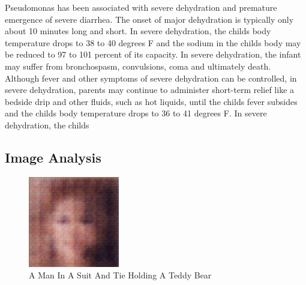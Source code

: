 \documentclass{article}%
\begin{document}
Pseudomonas has been associated with severe dehydration and premature emergence of severe diarrhea. The onset of major dehydration is typically only about 10 minutes long and short. In severe dehydration, the childs body temperature drops to 38 to 40 degrees F and the sodium in the childs body may be reduced to 97 to 101 percent of its capacity. In severe dehydration, the infant may suffer from bronchospasm, convulsions, coma and ultimately death. Although fever and other symptoms of severe dehydration can be controlled, in severe dehydration, parents may continue to administer short{-}term relief like a bedside drip and other fluids, such as hot liquids, until the childs fever subsides and the childs body temperature drops to 36 to 41 degrees F. In severe dehydration, the childs

%
\subsection{Image Analysis}%
\label{subsec:ImageAnalysis}%


\begin{figure}[h!]%
\centering%
\includegraphics[width=150px]{500_fake_images/samples_5_365.png}%
\caption{A Man In A Suit And Tie Holding A Teddy Bear}%
\end{figure}

%
\end{document}
